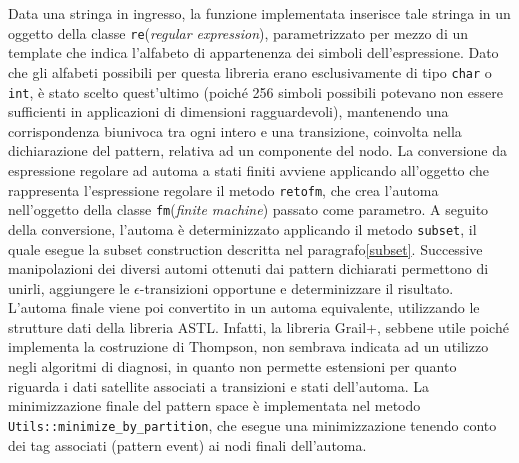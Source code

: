 Data una stringa in ingresso, la funzione implementata inserisce tale stringa in un oggetto della classe \verb|re|(\emph{regular expression}), parametrizzato per mezzo di un template che indica l'alfabeto di appartenenza dei simboli dell'espressione. 
Dato che gli alfabeti possibili per questa libreria erano esclusivamente di tipo \verb|char| o \verb|int|, è stato scelto quest'ultimo (poiché 256 simboli possibili potevano non essere sufficienti in applicazioni di dimensioni ragguardevoli), mantenendo una corrispondenza biunivoca tra ogni intero e una transizione, coinvolta nella dichiarazione del pattern, relativa ad un componente del nodo. La conversione da espressione regolare ad automa a stati finiti avviene applicando all'oggetto che rappresenta l'espressione regolare il metodo \verb|retofm|, che crea l'automa nell'oggetto della classe \verb|fm|(\emph{finite machine}) passato come parametro. A seguito della conversione, l'automa è determinizzato applicando il metodo \verb|subset|, il quale esegue la subset construction descritta nel paragrafo\ref{subset}.
Successive manipolazioni dei diversi automi ottenuti dai pattern dichiarati permettono di unirli, aggiungere le $\epsilon$-transizioni opportune e determinizzare il risultato. L'automa finale viene poi convertito in un automa equivalente, utilizzando le strutture dati della libreria ASTL. Infatti, la libreria Grail+, sebbene utile poiché implementa la costruzione di Thompson, non sembrava indicata ad un utilizzo negli algoritmi di diagnosi, in quanto non permette estensioni per quanto riguarda i dati satellite associati a transizioni e stati dell'automa.
La minimizzazione finale del pattern space è implementata nel metodo \verb|Utils::minimize_by_partition|, che esegue una minimizzazione tenendo conto dei tag associati (pattern event) ai nodi finali dell'automa.

